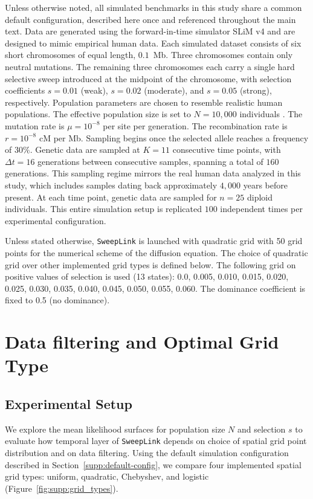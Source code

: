 \documentclass{article}
\newcommand{\SweepLink}{\texttt{SweepLink}\xspace}
\begin{document}
Unless otherwise noted, all simulated benchmarks in this study share a common default configuration, described here once and referenced throughout the main text.
Data are generated using the forward-in-time simulator SLiM v4 \citep{Haller2023} and are designed to mimic empirical human data.
Each simulated dataset consists of six short chromosomes of equal length, $0.1$~Mb.
Three chromosomes contain only neutral mutations.
The remaining three chromosomes each carry a single hard selective sweep introduced at the midpoint of the chromosome, with selection coefficients $s = 0.01$ (weak), $s = 0.02$ (moderate), and $s = 0.05$ (strong), respectively.
Population parameters are chosen to resemble realistic human populations.
The effective population size is set to $N = 10{,}000$ individuals \citep{Takahata1993}.
The mutation rate is $\mu = 10^{-8}$ per site per generation.
The recombination rate is $r = 10^{-8}$ cM per Mb.
Sampling begins once the selected allele reaches a frequency of $30\%$.
Genetic data are sampled at $K = 11$ consecutive time points, with $\Delta t = 16$ generations between consecutive samples, spanning a total of $160$ generations.
This sampling regime mirrors the real human data analyzed in this study, which includes samples dating back approximately $4{,}000$ years before present.
At each time point, genetic data are sampled for $n = 25$ diploid individuals.
This entire simulation setup is replicated $100$ independent times per experimental configuration.

Unless stated otherwise, \SweepLink is launched with quadratic grid with 50 grid points for the numerical scheme of the diffusion equation.
The choice of quadratic grid over other implemented grid types is defined below.
The following grid on positive values of selection is used (13 states): 0.0, 0.005, 0.010, 0.015, 0.020, 0.025, 0.030, 0.035, 0.040, 0.045, 0.050, 0.055, 0.060.
The dominance coefficient is fixed to 0.5 (no dominance).

\section{Data filtering and Optimal Grid Type}

\subsection{Experimental Setup}

We explore the mean likelihood surfaces for population size $N$ and selection $s$ to evaluate how temporal layer of \SweepLink depends on choice of spatial grid point distribution and on data filtering.
Using the default simulation configuration described in Section~\ref{supp:default-config}, we compare four implemented spatial grid types: uniform, quadratic, Chebyshev, and logistic (Figure~\ref{fig:supp:grid_types}).
\end{document}
